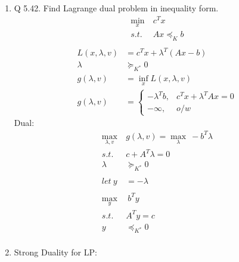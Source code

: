 \documentclass[12pt,letter]{article}
\begin{document}
\begin{enumerate}
  Relaxation of ith constraint by $\alpha$ percent:\\
  $\partial p^*(u_i,0) &= -\lambda_i^*\partial u_i$\\
  $\partial u_i = \alpha \implies$ objective function of log transformed problem experiences a decrease in value by $\lambda_i \alpha$\\
  Converting objective back via inverse of log: $x \to e^{y}$\\
  $z$ small $\implies e^{z} \approx 1+ z$ via Taylor expansion\\
  $e^{-\lambda_i^* \alpha} \approx 1 - \lambda_i^* \alpha \implies$ objective function experiences an improvement of $\lambda_i^* \alpha$ percent since it is a minimization problem.\\
  \pagebreak
\item Q 5.42. Find Lagrange dual problem in inequality form.
  \begin{align*}
    \min_x\ & c^Tx\\
    s.t.\ & Ax \preceq_K b\\
  \end{align*}
  \begin{align*}
    L(x,\lambda,v) & = c^Tx + \lambda^T(Ax-b)\\
    \lambda & \succeq_{K^*} 0\\
    g (\lambda,v) &= \inf_x L(x,\lambda,v)\\
    g (\lambda,v) &=
                    \begin{cases}
                      -\lambda^Tb, & c^Tx + \lambda^TAx = 0\\
                      -\infty, & o/w
                    \end{cases}
  \end{align*}
  Dual:
  \begin{align*}
    \max_{\lambda,v}\ & g(\lambda,v) = \max_{\lambda}\ -b^T\lambda\\
    s.t.\ & c+A^T\lambda = 0\\
    \lambda & \succeq_{K^*} 0\\
    \\
    let\ y & = -\lambda\\
    \\
    \max_{y}&\ b^Ty\\
    s.t.\ & A^Ty = c\\
    y & \preceq_{K^*} 0\\
  \end{align*}
  \pagebreak
\item Strong Duality for LP:\\

\end{enumerate}
\end{document}
